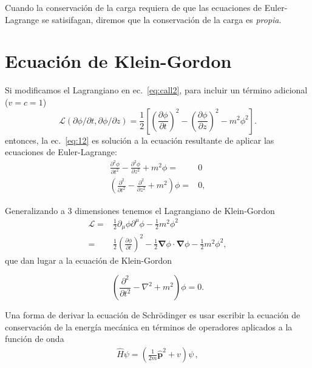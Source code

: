 Cuando la conservación de la carga requiera de que las ecuaciones de Euler-Lagrange se satisifagan, diremos que la conservación de la carga es \emph{propia}.

\section{Ecuación de Klein-Gordon}


Si modificamos el Lagrangiano en ec.~\eqref{eq:call2}, para incluir un
t\'ermino adicional ($v=c=1$)
\begin{equation}
  \label{eq:14}
  \mathcal{L}(\partial\phi/\partial t,\partial\phi/\partial z)=\frac{1}{2}
\left[
  \left(\frac{\partial\phi}{\partial t}\right)^2-\left(\frac{\partial\phi}{\partial z}\right)^2-m^2\phi^2
\right].
\end{equation}
entonces, la ec.~\eqref{eq:12} es soluci\'on a la ecuaci\'on resultante de
aplicar las ecuaciones de Euler-Lagrange:
\begin{align}
\label{eq:150}
      \frac{\partial^2\phi}{\partial t^2}-\frac{\partial^2\phi}{\partial z^2}+m^2\phi=&0\nonumber\\
      \left(\frac{\partial^2}{\partial t^2}-\frac{\partial^2}{\partial z^2}+m^2
      \right)\phi=&0,
\end{align}

Generalizando a 3 dimensiones tenemos el Lagrangiano de Klein-Gordon
\begin{align}
  \label{eq:15}
  \mathcal{L}=&\frac12 \partial_{\mu}\phi\partial^{\mu}\phi-\frac12 m^2\phi^{2}\nonumber\\
=&\frac{1}{2}
  \left(
\frac{\partial\phi}{\partial t}
  \right)^2-\tfrac{1}{2}\boldsymbol{\nabla}\phi\cdot\boldsymbol{\nabla}\phi-\tfrac{1}{2}m^2\phi^2,
\end{align}
que dan lugar a la ecuaci\'on de Klein-Gordon

\begin{equation}
\label{eq:152}
  \left(
\frac{\partial^2}{\partial t^2}-\nabla^2+m^2
  \right)\phi=0.
\end{equation}

Una forma de derivar la ecuación de Schr\"odinger es usar escribir la ecuación de conservación de la energía mecánica en términos de operadores aplicados a la función de onda
\begin{align}
  \widehat{H}\psi=\left( \frac{1}{2m}\widehat{\mathbf{p}}^{2}+v \right)\psi\,,
\end{align}

